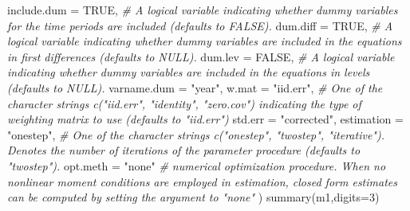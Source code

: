 \documentclass[
  12pt,
]{book}
\newenvironment{Shaded}{\begin{snugshade}}{\end{snugshade}}
\newcommand{\AttributeTok}[1]{\textcolor[rgb]{0.77,0.63,0.00}{#1}}
\newcommand{\CommentTok}[1]{\textcolor[rgb]{0.56,0.35,0.01}{\textit{#1}}}
\newcommand{\ConstantTok}[1]{\textcolor[rgb]{0.00,0.00,0.00}{#1}}
\newcommand{\DecValTok}[1]{\textcolor[rgb]{0.00,0.00,0.81}{#1}}
\newcommand{\FunctionTok}[1]{\textcolor[rgb]{0.00,0.00,0.00}{#1}}
\newcommand{\NormalTok}[1]{#1}
\newcommand{\StringTok}[1]{\textcolor[rgb]{0.31,0.60,0.02}{#1}}
\theoremstyle{definition}
\theoremstyle{definition}
\theoremstyle{definition}
\theoremstyle{definition}
\theoremstyle{remark}
\begin{document}
\begin{Shaded}
\begin{Highlighting}[]
             \AttributeTok{include.dum =} \ConstantTok{TRUE}\NormalTok{, }\CommentTok{\# A logical variable indicating whether dummy variables for the time periods are included (defaults to \textquotesingle{}FALSE\textquotesingle{}).}
             \AttributeTok{dum.diff =} \ConstantTok{TRUE}\NormalTok{, }\CommentTok{\# A logical variable indicating whether dummy variables are included in the equations in first differences (defaults to \textquotesingle{}NULL\textquotesingle{}).}
             \AttributeTok{dum.lev =} \ConstantTok{FALSE}\NormalTok{, }\CommentTok{\# A logical variable indicating whether dummy variables are included in the equations in levels (defaults to \textquotesingle{}NULL\textquotesingle{}).}
             \AttributeTok{varname.dum =} \StringTok{"year"}\NormalTok{,}
             \AttributeTok{w.mat =} \StringTok{"iid.err"}\NormalTok{, }\CommentTok{\# One of the character strings c(\textquotesingle{}"iid.err"\textquotesingle{}, \textquotesingle{}"identity"\textquotesingle{}, \textquotesingle{}"zero.cov"\textquotesingle{}) indicating the type of weighting matrix to use (defaults to \textquotesingle{}"iid.err"\textquotesingle{})}
             \AttributeTok{std.err =} \StringTok{"corrected"}\NormalTok{,}
             \AttributeTok{estimation =} \StringTok{"onestep"}\NormalTok{, }\CommentTok{\# One of the character strings c(\textquotesingle{}"onestep"\textquotesingle{}, \textquotesingle{}"twostep"\textquotesingle{}, \textquotesingle{}"iterative"\textquotesingle{}). Denotes the number of iterations of the parameter procedure (defaults to \textquotesingle{}"twostep"\textquotesingle{}).}
             \AttributeTok{opt.meth =} \StringTok{"none"} \CommentTok{\# numerical optimization procedure. When no nonlinear moment conditions are employed in estimation, closed form estimates can be computed by setting the argument to \textquotesingle{}"none"}
\NormalTok{)}
\FunctionTok{summary}\NormalTok{(m1,}\AttributeTok{digits=}\DecValTok{3}\NormalTok{)}
\end{Highlighting}
\end{Shaded}
\end{document}
